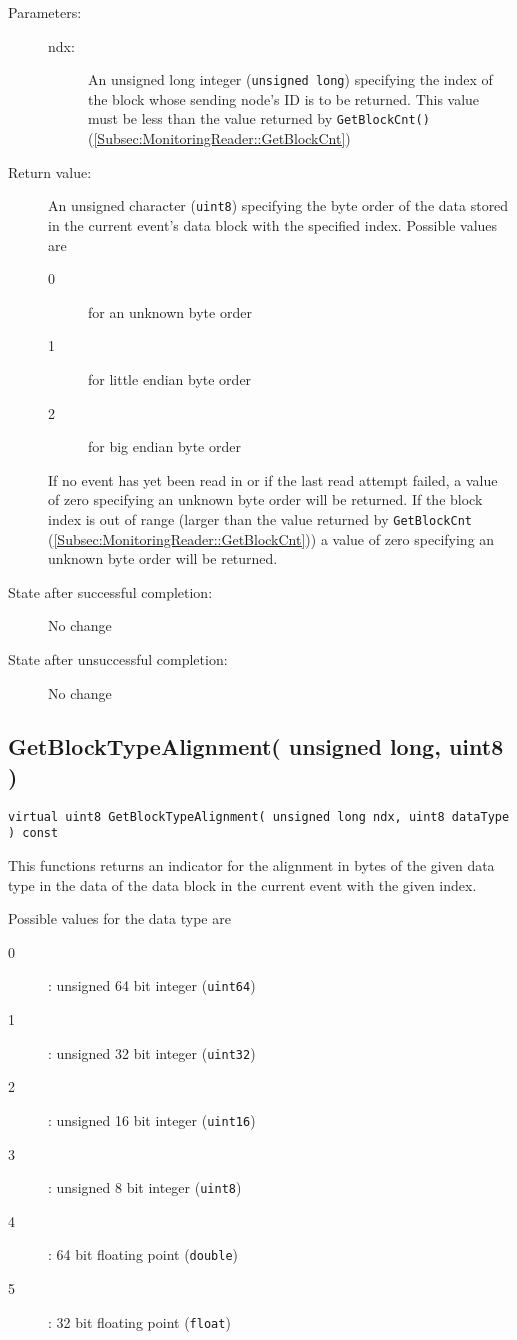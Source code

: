 \documentclass[a4paper,twoside]{article}
\begin{document}
\begin{description}
\item[Parameters:]
	\begin{description}
		\item[ndx:] An unsigned long integer (\texttt{unsigned long}) specifying the index of the block whose sending node's ID is 
		to be returned. This value must be less than the value returned by \texttt{GetBlockCnt()} (\ref{Subsec:MonitoringReader::GetBlockCnt})
	\end{description}
\item[Return value:] An unsigned character (\texttt{uint8}) specifying the byte order of the data stored in the current event's data block with the 
specified index. Possible values are
\begin{description}
\item[0] for an unknown byte order
\item[1] for little endian byte order
\item[2] for big endian byte order
\end{description}
If no event has yet been read in or if the last read attempt failed, a value of zero specifying an unknown byte order will be returned.
If the block index is out of range (larger than the value returned by \texttt{GetBlockCnt} (\ref{Subsec:MonitoringReader::GetBlockCnt}))
a value of zero specifying an unknown byte order will be returned.
\item[State after successful completion:] No change
\item[State after unsuccessful completion:] No change
\end{description}


\subsection{GetBlockTypeAlignment( unsigned long, uint8 )}
\label{Subsec:MonitoringReader::GetBlockTypeAlignment}
\texttt{virtual uint8 GetBlockTypeAlignment( unsigned long ndx, uint8 dataType ) const}

This functions returns an indicator for the alignment in bytes of the given data type in the data of the data block in the current event
with the given index. 

Possible values for the data type are
\begin{description}
\item[0]: unsigned 64 bit integer (\texttt{uint64})
\item[1]: unsigned 32 bit integer (\texttt{uint32})
\item[2]: unsigned 16 bit integer (\texttt{uint16})
\item[3]: unsigned 8 bit integer (\texttt{uint8})
\item[4]: 64 bit floating point (\texttt{double})
\item[5]: 32 bit floating point (\texttt{float})
\end{description}
\end{document}
